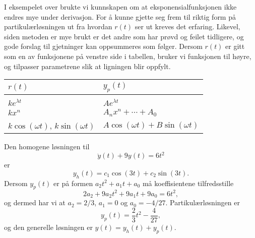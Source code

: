 \documentclass{article}
\theoremstyle{definition}
\theoremstyle{remark}
\newenvironment{ex}
{\pushQED{\qed}\renewcommand{\qedsymbol}{$\triangle$}\exx}
{\popQED\endexx}
\begin{document}
\begin{multicols*}{2}
I eksempelet over brukte vi kunnskapen om at eksponensialfunksjonen ikke endres mye under derivasjon. For å kunne gjette seg frem til riktig form på partikulærløsningen ut fra hvordan $r(t)$ ser ut kreves det erfaring. Likevel, siden metoden er mye brukt er det andre som har prøvd og feilet tidligere, og gode forslag til gjetninger kan oppsummeres som følger. Dersom $r(t)$ er gitt som en av funksjonene på venstre side i tabellen, bruker vi funksjonen til høyre, og tilpasser parametrene slik at ligningen blir oppfylt.

\begin{center}
  \begin{tabular}{m{} | m{}}
    $r(t)$ & $y_p(t)$ \\
    \hline \\
    $ke^{\lambda t}$ & $A e^{\lambda t}$ \\
    $k x^{n}$ & $A_n x^n + \cdots + A_0$ \\
    $k \cos(\omega t)$, $k \sin(\omega t)$ & \noindent\parbox[b]{\hsize}{$A \cos(\omega t) + B\sin(\omega t)$} \\
    $k e^{\lambda t} \cos(\omega t)$, $k e^{\lambda t} \sin(\omega t)$ & $e^{\lambda t} (A \cos(\omega t) + B\sin(\omega t))$ \\
  \end{tabular}
\end{center}

\begin{ex}
  Den homogene løsningen til
  \begin{equation*}
    \ddot{y}(t) + 9 y(t) = 6t^2
  \end{equation*}
  er
  \begin{equation*}
    y_h(t) = c_1 \cos(3t) + c_2 \sin(3t).
  \end{equation*}
  Dersom $y_p(t)$ er på formen $a_2 t^2 + a_1 t + a_0$ må koeffisientene tilfredsstille
  \begin{equation*}
    2a_2 + 9a_2 t^2 + 9a_1 t + 9 a_0 = 6 t^2,
  \end{equation*}
  og dermed har vi at $a_2 = 2/3$, $a_1 = 0$ og $a_0 = - 4/27$. Partikulærløsningen er
  \begin{equation*}
    y_p(t) = \frac{2}{3} t^2 - \frac{4}{27},
  \end{equation*}
  og den generelle løsningen er $y(t) = y_h(t) + y_p(t)$.
\end{ex}


\end{multicols*}
\end{document}
